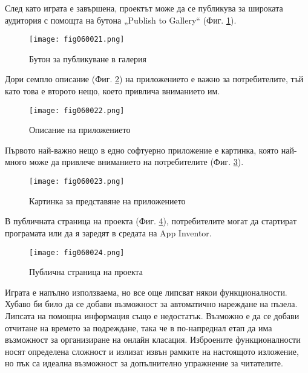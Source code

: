 След като играта е завършена, проектът може да се публикува за широката аудитория с помощта на бутона „Publish to Gallery“ (Фиг. \ref{fig060021}).

\begin{figure}[H]
  \centering
  \texttt{[image: fig060021.png]}
  \caption{Бутон за публикуване в галерия}
\label{fig060021}
\end{figure}

Дори семпло описание (Фиг. \ref{fig060022}) на приложението е важно за потребителите, тъй като това е второто нещо, което привлича вниманието им.

\begin{figure}[H]
  \centering
  \texttt{[image: fig060022.png]}
  \caption{Описание на приложението}
\label{fig060022}
\end{figure}

Първото най-важно нещо в едно софтуерно приложение е картинка, която най-много може да привлече вниманието на потребителите (Фиг. \ref{fig060023}).

\begin{figure}[H]
  \centering
  \texttt{[image: fig060023.png]}
  \caption{Картинка за представяне на приложението}
\label{fig060023}
\end{figure}

В публичната страница на проекта (Фиг. \ref{fig060024}), потребителите могат да стартират програмата или да я заредят в средата на App Inventor.

\begin{figure}[H]
  \centering
  \texttt{[image: fig060024.png]}
  \caption{Публична страница на проекта}
\label{fig060024}
\end{figure}

Играта е напълно използваема, но все още липсват някои функционалности. Хубаво би било да се добави възможност за автоматично нареждане на пъзела. Липсата на помощна информация също е недостатък. Възможно е да се добави отчитане на времето за подреждане, така че в по-напреднал етап да има възможност за организиране на онлайн класация. Изброените функционалности носят определена сложност и излизат извън рамките на настоящото изложение, но пък са идеална възможност за допълнително упражнение за читателите. 

